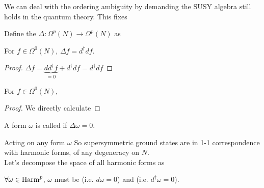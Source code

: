 \documentclass{article}
\begin{document}
We can deal with the ordering ambiguity by demanding the SUSY algebra 
still holds in the quantum theory. This fixes 
\begin{definition}
	Define the  $\Delta : \Omega^p(N) \to \Omega^p(N)$ as
\end{definition}
\begin{lemma}
For $f \in \Omega^0(N)$, $\Delta f = d^\dagger d f$.	
\end{lemma}
\begin{proof}
$
\Delta f = \underbrace{d d^\dagger f}_{=0} + d^\dagger d f
= d^\dagger d f $
\end{proof}
\begin{prop}
	For $f \in \Omega^0(N)$, 
\end{prop}
\begin{proof}
	\begin{comment}
using 
\eq{
d^\dagger \omega = \frac{1}{(n-1)!} g^{ab} \del_a \omega_{[bc\dots d]} dx^c \wedge \dots \wedge dx^d
}
\end{comment}
We directly calculate
\end{proof}
\begin{definition}
	A form $\omega$ is called  if $\Delta \omega = 0$. 
\end{definition}

Acting on any form $\omega$ 
So supersymmetric ground states are in 1-1 correspondence with harmonic forms, of any degeneracy on $N$.\\
Let's decompose the space of all harmonic forms as 
\begin{lemma}
$\forall \omega \in \operatorname{Harm}^p$, $\omega$ must be  (i.e. $d\omega = 0$) and  (i.e. $d^\dagger \omega = 0$).
\end{lemma}
\end{document}
